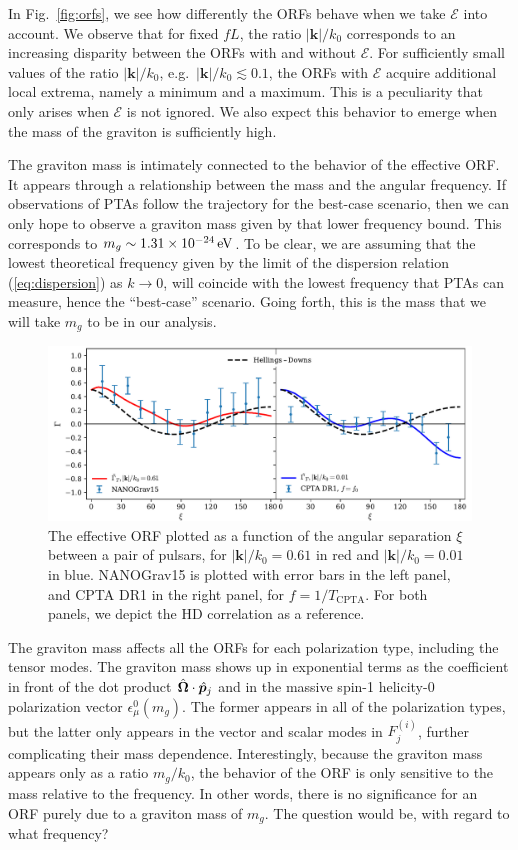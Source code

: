\documentclass[10pt,prd,twocolumn,aps,nofootinbib,nobibnotes,superscriptaddress,preprintnumbers]{revtex4-2}
\newcommand{\eV}{\,{\rm eV}}
\begin{document}
In Fig.~\ref{fig:orfs}, we see how differently the ORFs behave when we take $\mathcal{E}$ into account. We observe that for fixed $fL$, the ratio $|\boldsymbol{k}|/k_0$ corresponds to an increasing disparity between the ORFs with and without $\mathcal{E}$. For sufficiently small values of the ratio $|\boldsymbol{k}|/k_0$, e.g.\ $|\boldsymbol{k}|/k_0 \lesssim 0.1$, the ORFs with $\mathcal{E}$ acquire additional local extrema, namely a minimum and a maximum. This is a peculiarity that only arises when $\mathcal{E}$ is not ignored. We also expect this behavior to emerge when the mass of the graviton is sufficiently high.

The graviton mass is intimately connected to the behavior of the effective ORF. It appears through a relationship between the mass and the angular frequency. 
If observations of PTAs follow the trajectory for the best-case scenario, then we can only hope to observe a graviton mass given by that lower frequency bound. This corresponds to $m_g \sim 1.31\times 10^{-24} \eV$. To be clear, we are assuming that the lowest theoretical frequency given by the limit of the dispersion relation (\ref{eq:dispersion}) as $k\rightarrow 0$, will coincide with the lowest frequency that PTAs can measure, hence the ``best-case'' scenario. Going forth, this is the mass that we will take $m_g$ to be in our analysis.

\begin{figure}[ht]
    \includegraphics[width=.95\textwidth]{fig2.pdf}
    \caption{The effective ORF plotted as a function of the angular separation $\xi$ between a pair of pulsars, for $|\boldsymbol{k}|/k_0 = 0.61$ in red and $|\boldsymbol{k}|/k_0 = 0.01$ in blue. NANOGrav15 is plotted with error bars in the left panel, and CPTA DR1 in the right panel, for $f = 1/T_{\text{CPTA}}$. For both panels, we depict the HD correlation as a reference.}
    \label{fig:pta_compare}
\end{figure}

The graviton mass affects all the ORFs for each polarization type, including the tensor modes. The graviton mass shows up in exponential terms as the coefficient in front of the dot product $\hat{\bf \Omega}\cdot \hat{\boldsymbol{p}}_j$ and in the massive spin-1 helicity-0 polarization vector $\epsilon_\mu^0(m_g)$. The former appears in all of the polarization types, but the latter only appears in the vector and scalar modes in $F_j^{(i)}$, further complicating their mass dependence. Interestingly, because the graviton mass appears only as a ratio $m_g / k_0$, the behavior of the ORF is only sensitive to the mass relative to the frequency. In other words, there is no significance for an ORF purely due to a graviton mass of $m_g$. The question would be, with regard to what frequency?
\end{document}
